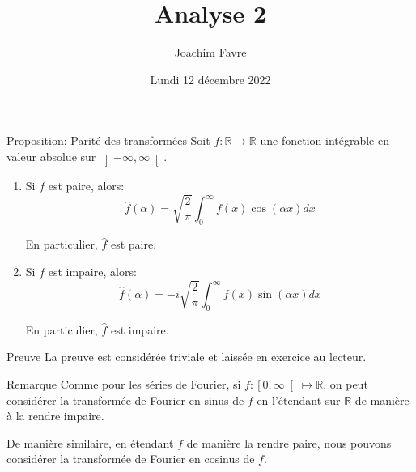 \documentclass[a4paper]{article}
\title{Analyse 2}
\author{Joachim Favre}
\date{Lundi 12 décembre 2022}
\begin{document}
\maketitle


\begin{parag}{Proposition: Parité des transformées}
    Soit $f: \mathbb{R} \mapsto \mathbb{R}$ une fonction intégrable en valeur absolue sur $\left]-\infty, \infty\right[ $.

    \begin{enumerate}
        \item Si $f$ est paire, alors: 
        \[\hat{f}\left(\alpha\right) = \sqrt{\frac{2}{\pi}} \int_{0}^{\infty} f\left(x\right) \cos\left(\alpha x\right)dx\]

        En particulier, $\hat{f}$ est paire.
        \item Si $f$ est impaire, alors: 
        \[\hat{f}\left(\alpha\right) = -i\sqrt{\frac{2}{\pi}} \int_{0}^{\infty} f\left(x\right)\sin\left(\alpha x\right)dx\]
        
        En particulier, $\hat{f}$ est impaire.
    \end{enumerate}

    \begin{subparag}{Preuve}
        La preuve est considérée triviale et laissée en exercice au lecteur.
    \end{subparag}
\end{parag}

\begin{parag}{Remarque}
    Comme pour les séries de Fourier, si $f: \left[0, \infty\right[  \mapsto \mathbb{R}$, on peut considérer la transformée de Fourier en sinus de $f$ en l'étendant sur $\mathbb{R}$ de manière à la rendre impaire.

    De manière similaire, en étendant $f$ de manière la rendre paire, nous pouvons considérer la transformée de Fourier en cosinus de $f$.
\end{parag}
\end{document}
